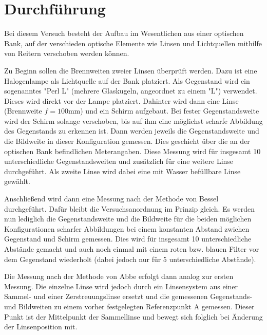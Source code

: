 \section{Durchführung}
\label{sec:Durchführung}
Bei diesem Versuch besteht der Aufbau im Wesentlichen aus einer optischen Bank, auf
der verschieden optische Elemente wie Linsen und Lichtquellen mithilfe von Reitern
verschoben werden können.

Zu Beginn sollen die Brennweiten zweier Linsen überprüft werden. Dazu ist eine Halogenlampe als Lichtquelle auf
der Bank platziert. Als Gegenstand wird ein sogenanntes "Perl L" (mehrere Glaskugeln, angeordnet zu einem "L")
verwendet. Dieses wird direkt vor der Lampe platziert. Dahinter wird dann eine Linse (Brennweite $f = 100$mm) und ein Schirm aufgebaut.
Bei fester Gegenstandsweite wird der Schirm solange verschoben, bis auf ihm eine möglichst scharfe Abbildung des
Gegenstands zu erkennen ist. Dann werden jeweils die Gegenstandsweite und die Bildweite in dieser Konfiguration
gemessen. Dies geschieht über die an der optischen Bank befindlichen Meterangaben. Diese Messung wird für insgesamt 10 unterschiedliche
Gegenstandsweiten und zusätzlich für eine weitere Linse durchgeführt. Als zweite Linse wird dabei eine mit Wasser befüllbare Linse
gewählt.

Anschließend wird dann eine Messung nach der Methode von Bessel durchgeführt. Dafür bleibt die Versuchsanordnung im
Prinzip gleich. Es werden nun lediglich die Gegenstandsweite und die Bildweite für die beiden möglichen Konfigurationen
scharfer Abbildungen bei einem konstanten Abstand zwichen Gegenstand und Schirm gemessen. Dies wird für insgesamt 10 unterschiedliche
Abstände gemacht und auch noch einmal mit einem roten bzw. blauen Filter vor dem Gegenstand wiederholt (dabei jedoch nur für 5 unterschiedliche
Abstände).

Die Messung nach der Methode von Abbe erfolgt dann analog zur ersten Messung. Die einzelne Linse wird jedoch durch ein Linsensystem aus einer
Sammel- und einer Zerstreuungslinse ersetzt und die gemessenen Gegenstands- und Bildweiten zu einem vorher festgelegten Referenzpunkt A gemessen.
Dieser Punkt ist der Mittelpunkt der Sammellinse und bewegt sich folglich bei Änderung der Linsenposition mit.
